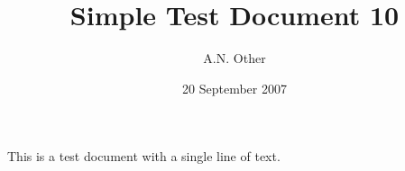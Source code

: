 \documentclass{article}
\date{20 September 2007}
\author{A.N. Other}
\title{Simple Test Document 10}
\begin{document}
\maketitle

This is a test document with a single line of text.
\end{document}
